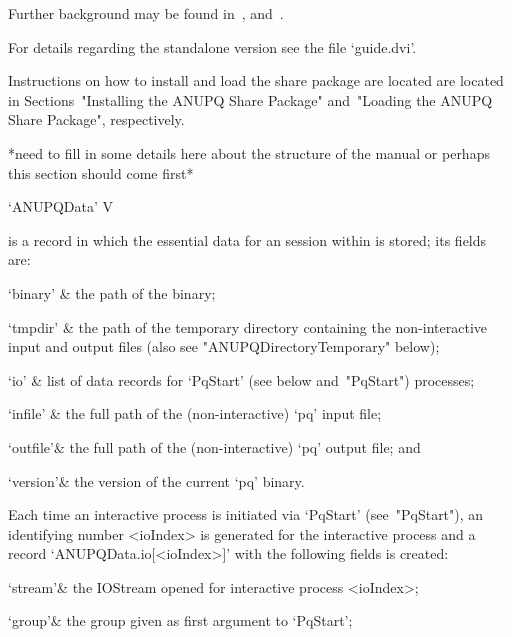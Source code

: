 \endlist

Further   background   may   be   found   in~\cite{OBr95},   \cite{Vau84}
and~\cite{NNN98}.

For details regarding the standalone version see the file `guide.dvi'.


Instructions on how to install and load the {\ANUPQ}  share  package  are
located are located in  Sections~"Installing  the  ANUPQ  Share  Package"
and~"Loading the ANUPQ Share Package", respectively.

*need to fill in some details here about the structure of the manual
 or perhaps this section should come first*


\>`ANUPQData' V

is a {\GAP} record in which the essential data for  an  {\ANUPQ}  session
within {\GAP} is stored; its fields are:

\beginitems

\quad`binary' & the path of the {\ANUPQ} binary;

\quad`tmpdir' & the  path  of  the  temporary  directory  containing  the
non-interactive   {\ANUPQ}   input   and   output   files    (also    see
"ANUPQDirectoryTemporary" below);

\quad`io' & list of data records for `PqStart' (see below  and~"PqStart")
processes;

\quad`infile' & the full path of the (non-interactive) `pq' input file;

\quad`outfile'& the full path of the (non-interactive) `pq' output  file;
and

\quad`version'& the version of the current `pq' binary.

\enditems

Each time an interactive {\ANUPQ}  process  is  initiated  via  `PqStart'
(see~"PqStart"), an identifying number <ioIndex>  is  generated  for  the
interactive process  and  a  record  `ANUPQData.io[<ioIndex>]'  with  the
following fields is created:

\beginitems

\quad`stream'& the  IOStream  opened  for  interactive  {\ANUPQ}  process
<ioIndex>;

\quad`group'& the group given as first argument to `PqStart';

